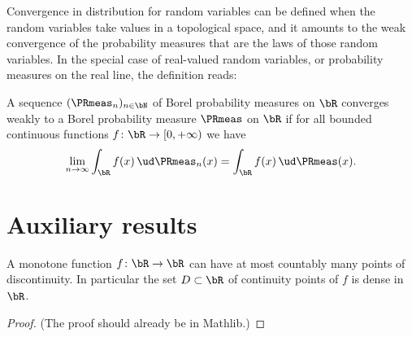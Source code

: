 Convergence in distribution for random variables can be defined when the random variables
take values in a topological space, and it amounts to the weak convergence of the
probability measures that are the laws of those random variables. In the special case
of real-valued random variables, or probability measures on the real line, the definition
reads:
\begin{definition}
  \label{def:convergence-in-distribution}
  \leanok
  \mathlibok
  A sequence $(\PRmeas_n)_{n \in \bN}$ of Borel probability measures on $\bR$ converges
  weakly to a Borel probability measure $\PRmeas$ on $\bR$ if for all bounded continuous
  functions $f \colon \bR \to [0,+\infty)$ we have
  \begin{align*}
    \lim_{n \to \infty} \int_{\bR} f(x) \, \ud \PRmeas_n(x)
    = \int_{\bR} f(x) \, \ud \PRmeas(x) .
  \end{align*}
\end{definition}

\section{Auxiliary results}

\begin{lemma}
  \label{lem:monotone-discontinuities-countable}
  \leanok
  \mathlibok
  A monotone function $f \colon \bR \to \bR$ can have at most countably
  many points of discontinuity. In particular the set $D \subset \bR$
  of continuity points of $f$ is dense in $\bR$.
\end{lemma}
\begin{proof}
  \leanok
  \mathlibok
  (The proof should already be in Mathlib.)
\end{proof}

